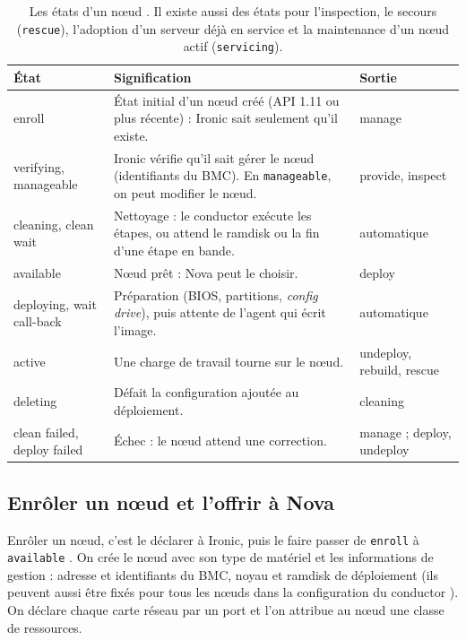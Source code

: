 \begin{table}[!ht]
\centering
\renewcommand{\arraystretch}{1.3}
\begin{tabular}{@{}>{\raggedright\arraybackslash\ttfamily\small}p{3.6cm}>{\raggedright\arraybackslash}p{8.6cm}>{\raggedright\arraybackslash\ttfamily\small}p{3.3cm}@{}}
\toprule
\textrm{\textbf{État}} & \textbf{Signification} & \textrm{\textbf{Sortie}} \\
\midrule
enroll & État initial d'un nœud créé (API 1.11 ou plus récente) : Ironic sait seulement qu'il existe. & manage \\
verifying, manageable & Ironic vérifie qu'il sait gérer le nœud (identifiants du BMC). En \texttt{manageable}, on peut modifier le nœud. & provide, inspect \\
cleaning, clean wait & Nettoyage : le conductor exécute les étapes, ou attend le ramdisk ou la fin d'une étape en bande. & automatique \\
available & Nœud prêt : Nova peut le choisir. & deploy \\
deploying, wait call-back & Préparation (BIOS, partitions, \emph{config drive}), puis attente de l'agent qui écrit l'image. & automatique \\
active & Une charge de travail tourne sur le nœud. & undeploy, rebuild, rescue \\
deleting & Défait la configuration ajoutée au déploiement. & cleaning \\
clean failed, deploy failed & Échec : le nœud attend une correction. & manage ; deploy, undeploy \\
\bottomrule
\end{tabular}
\caption{Les états d'un nœud \parencite{ironic-states}. Il existe aussi des états pour l'inspection, le secours (\texttt{rescue}),
l'adoption d'un serveur déjà en service et la maintenance d'un nœud actif (\texttt{servicing}).}
\label{tab:ir-etats}
\end{table}

\subsection{Enrôler un nœud et l'offrir à Nova}\label{sec:ir-enrol}

Enrôler un nœud, c'est le déclarer à Ironic, puis le faire passer de \texttt{enroll} à \texttt{available}
\parencite{ironic-enrollment,osc-baremetal}. On crée le nœud avec son type de matériel et les informations de gestion : adresse et
identifiants du BMC, noyau et ramdisk de déploiement (ils peuvent aussi être fixés pour tous les nœuds dans la
configuration du conductor \parencite{ironic-glance-images}). On déclare chaque carte réseau par un port et l'on attribue au
nœud une classe de ressources.


